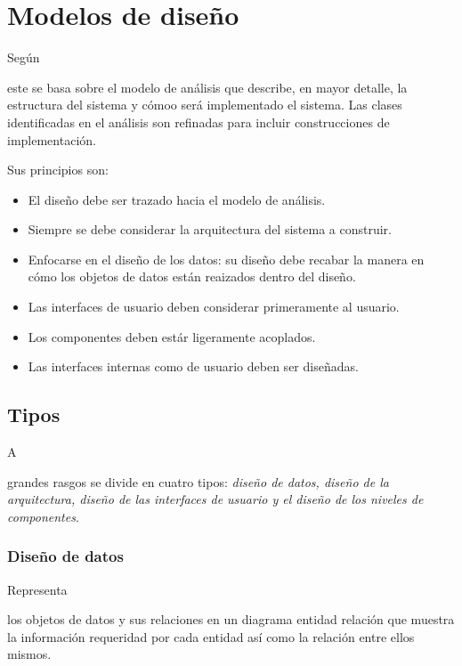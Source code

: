 \documentclass[stu, 12pt, letterpaper, donotrepeattitle, floatsintext, natbib]{apa7}
\begin{document}
\section{Modelos de diseño}
Según \cite{unknown-author-no-date} %
    \begin{justifying}
        este se basa sobre el modelo de análisis que describe, en mayor detalle,
            la estructura del sistema y cómoo será implementado el sistema. Las clases
            identificadas en el análisis son refinadas para incluir construcciones de implementación.\par
            Sus principios son:
            \begin{itemize}
                \item El diseño debe ser trazado hacia el modelo de análisis.
                \item Siempre se debe considerar la arquitectura del sistema a construir.
                \item Enfocarse en el diseño de los datos: su diseño debe recabar la manera en cómo los objetos de datos están reaizados dentro del diseño.
                \item Las interfaces de usuario deben considerar primeramente al usuario.
                \item Los componentes deben estár ligeramente acoplados.
                \item Las interfaces internas como de usuario deben ser diseñadas.
            \end{itemize}\par
    \end{justifying}    
    \vspace{\baselineskip}
\subsection{Tipos}
A \begin{justifying}
    grandes rasgos se divide en cuatro tipos: \citep{tawde-2021} \emph{diseño de datos, diseño de la arquitectura, diseño de las interfaces de usuario y el diseño de los niveles
    de componentes}.\par  
\end{justifying}
\subsubsection{Diseño de datos}
Representa \begin{justifying}
    los objetos de datos y sus relaciones en un diagrama entidad relación que muestra la información requeridad por cada entidad así como
    la relación entre ellos mismos.\par
\end{justifying}
\end{document}
